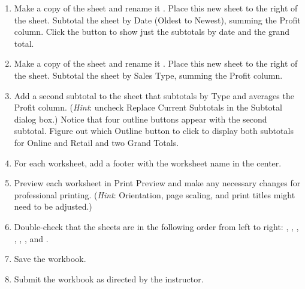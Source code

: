 \begin{enumerate}[resume]
	\item Make a copy of the  sheet and rename it . Place this new sheet to the right of the  sheet. Subtotal the sheet by Date (Oldest to Newest), summing the Profit column. Click the  button to show just the subtotals by date and the grand total.
	\item Make a copy of the  sheet and rename it . Place this new sheet to the right of the  sheet. Subtotal the sheet by Sales Type, summing the Profit column.
	\item Add a second subtotal to the  sheet that subtotals by Type and averages the Profit column. (\textit{Hint}: uncheck Replace Current Subtotals in the Subtotal dialog box.) Notice that four outline buttons appear with the second subtotal. Figure out which Outline button to click to display both subtotals for Online and Retail and two Grand Totals.
	\item For each worksheet, add a footer with the worksheet name in the center.
	\item Preview each worksheet in Print Preview and make any necessary changes for professional printing. (\textit{Hint}: Orientation, page scaling, and print titles might need to be adjusted.)
	\item Double-check that the sheets are in the following order from left to right: , , , , , , and .
	\item Save the  workbook.
	\item Submit the  workbook as directed by the instructor.
\end{enumerate}
